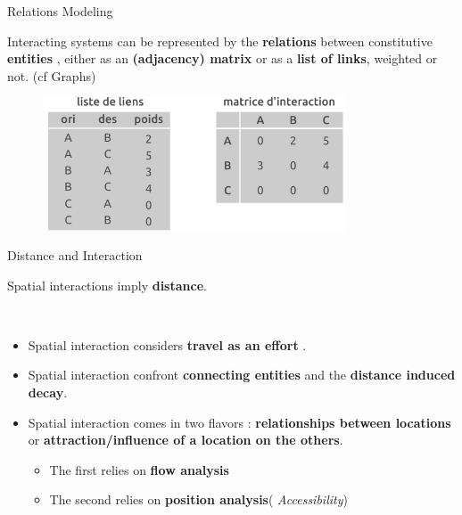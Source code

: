 \begin{frame}{Relations Modeling}

Interacting systems can be represented  by the \textbf{relations} between constitutive \textbf{entities} , either as an \textbf{(adjacency) matrix} or as a \textbf{list of links}, weighted or not. (cf Graphs)

\begin{figure}
  \includegraphics[width=9cm]{MatriceOD.pdf}
\end{figure}

\end{frame}



\begin{frame}{Distance and Interaction}

Spatial interactions imply \textbf{distance}.

~

\begin{itemize}
  \item Spatial interaction considers \textbf{ travel as an effort }.
  \item Spatial interaction confront \textbf{connecting entities} and the \textbf{distance induced decay}.
  \item Spatial interaction comes in two flavors : \textbf{relationships between locations}  or \textbf{attraction/influence of a location on the others}. 
  \begin{itemize}
  \item The first relies on \textbf{flow analysis}
  \item The second relies on \textbf{position analysis}(\textit{ Accessibility})
  \end{itemize}
\end{itemize}

\end{frame}


